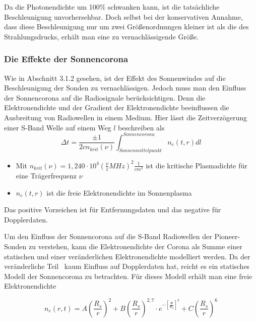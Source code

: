 Da die Photonendichte um 100\% schwanken kann, ist die tats\"achliche
Beschleunigung unvorhersehbar. Doch selbst bei der konservativen
Annahme, dass diese Beschleunigung nur um zwei Gr\"o{\ss}enordnungen
kleiner ist als die des Strahlungsdrucks, erh\"alt man eine zu
vernachl\"assigende Gr\"o{\ss}e. 


\bigskip

\subsubsection{Die Effekte der Sonnencorona}

Wie in Abschnitt 3.1.2 gesehen, ist der Effekt des Sonnenwindes auf die
Beschleunigung der Sonden zu vernachl\"assigen. Jedoch muss man den
Einfluss der Sonnencorona auf die Radiosignale ber\"ucksichtigen. Denn
die Elektronendichte und der Gradient der Elektronendichte beeinflussen
die Ausbreitung von Radiowellen in einem Medium. Hier l\"asst die
Zeitverz\"ogerung einer S-Band Welle auf einem Weg  $l$ beschreiben als
\begin{equation}
\Delta t=\frac{\pm 1}{2\mathit{cn}_{\mathit{krit}}(\nu )}\int
_{\mathit{Sonnenmittelpunkt}}^{\mathit{Sonnencorona}}n_{e}(t,r)\mathit{dl}
\end{equation}
\cite{Anderson2002}

\begin{itemize}
\item Mit $n_{\mathit{krit}}(\nu )=1,240\cdot 10^{4}(\frac{\nu
}{1}\mathit{MHz})^{2}\frac{1}{\mathit{cm}^{3}}$ ist die kritische
Plasmadichte f\"ur eine Tr\"agerfrequenz  $\nu $

\item $n_{e}(t,r)$ ist die freie Elektronendichte im Sonnenplasma
\end{itemize}

Das positive Vorzeichen ist f\"ur Entfernungsdaten und das negative
f\"ur Dopplerdaten.

Um den Einfluss der Sonnencorona auf die S-Band Radiowellen der
Pioneer-Sonden zu verstehen, kann die Elektronendichte der Corona als
Summe einer statischen und einer ver\"anderlichen Elektronendichte
modelliert werden. Da der ver\"anderliche Teil \ kaum Einfluss auf
Dopplerdaten hat\cite{Anderson2002}, reicht es ein statisches Modell der Sonnencorona
zu betrachten. F\"ur dieses Modell erh\"alt man eine freie
Elektronendichte

\begin{equation}
n_{e}(r,t)=A(\frac{R_{s}}{r})^{2}+B(\frac{R_{s}}{r})^{2,7}\cdot
e^{-[\frac{\Phi }{\Phi _{0}}]^{2}}+C(\frac{R_{s}}{r})^{6}
\end{equation}
\cite{Anderson2002}

